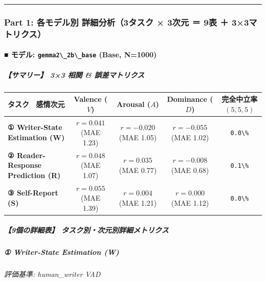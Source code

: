 \vspace{0.5em}\hrule\vspace{0.5em}

\subsubsection{Part 1: 各モデル別 詳細分析（3タスク × 3次元 ＝ 9表 ＋ 3×3マトリクス）}

\paragraph{■ モデル: \texttt{gemma2\textbackslash{}\_2b\textbackslash{}\_base} (Base, N=1000)}

\subparagraph{【サマリー】 3×3 相関 \& 誤差マトリクス}
\begin{center}
\small
\begin{tabular}{lcccc}
\toprule
\textbf{タスク \ 感情次元} & \textbf{Valence ($V$)} & \textbf{Arousal ($A$)} & \textbf{Dominance ($D$)} & \textbf{完全中立率 $(5,5,5)$} \\
\midrule
\textbf{① Writer-State Estimation (W)} & \textbf{$r=0.041$} (MAE 1.23) & \textbf{$r=-0.020$} (MAE 1.05) & \textbf{$r=-0.055$} (MAE 1.02) & \texttt{0.0\textbackslash{}\%} \\
\textbf{② Reader-Response Prediction (R)} & \textbf{$r=0.048$} (MAE 1.07) & \textbf{$r=0.035$} (MAE 0.77) & \textbf{$r=-0.008$} (MAE 0.68) & \texttt{0.1\textbackslash{}\%} \\
\textbf{③ Self-Report (S)} & \textbf{$r=0.055$} (MAE 1.39) & \textbf{$r=0.004$} (MAE 1.21) & \textbf{$r=0.000$} (MAE 1.12) & \texttt{0.0\textbackslash{}\%} \\
\bottomrule
\end{tabular}
\end{center}



\subparagraph{【9個の詳細表】 タスク別・次元別詳細メトリクス}

\subparagraph{① Writer-State Estimation (W)}
\textit{評価基準: human\_writer VAD}

